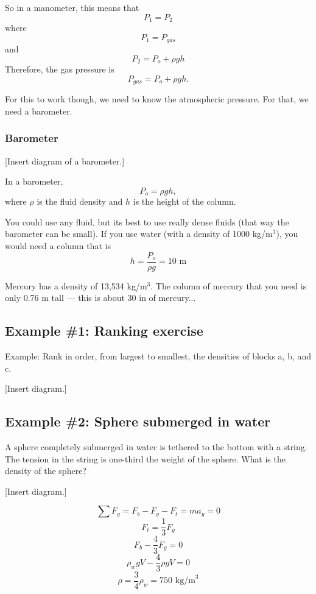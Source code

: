 So in a manometer, this means that 
$$P_1=P_2$$
where
$$P_1=P_{gas}$$
and
$$P_2=P_o+\rho gh$$
Therefore, the gas pressure is
$$P_{gas}=P_o+\rho gh.$$

For this to work though, we need to know the atmospheric pressure. For that, we need a barometer.

\subsubsection{Barometer}
[Insert diagram of a barometer.]\nopagebreak
\vspace{5cm}

In a barometer, 
$$P_o=\rho gh,$$
where $\rho$ is the fluid density and $h$ is the height of the column.

You could use any fluid, but its best to use really dense fluids (that way the barometer can be small). If you use water (with a density of 1000 kg/m$^3$), you would need a column that is
$$h=\frac{P_o}{\rho g}=10\mbox{ m}$$

Mercury has a density of 13,534 kg/m$^3$. The column of mercury that you need is only 0.76 m tall --- this is about 30 in of mercury...

\subsection{Example \#1: Ranking exercise} 
Example: Rank in order, from largest to smallest, the densities of blocks a, b, and c.

[Insert diagram.]
\vspace{5cm}

\subsection*{Example \#2: Sphere submerged in water}
A sphere completely submerged in water is tethered to the bottom with a string. The tension in the string is one-third the weight of the sphere. What is the density of the sphere?

[Insert diagram.]\nopagebreak
\vspace{5cm}

$$\sum F_y = F_b-F_g-F_t = ma_y = 0$$
$$F_t = \frac{1}{3}F_g$$
$$F_b-\frac{4}{3}F_g = 0$$
$$\rho_wgV-\frac{4}{3}\rho gV=0$$
$$\rho=\frac{3}{4}\rho_w=\boxed{750\mbox{ kg/m}^3}$$


